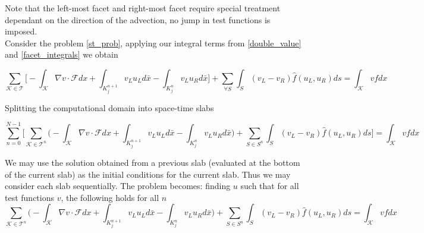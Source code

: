 \documentclass[11pt, oneside]{article}   	%
\begin{document}
Note that the left-most facet and right-most facet require special treatment dependant on the direction of the advection, no jump in test functions is imposed.\\
Consider the problem \eqref{st_prob}, applying our integral terms from \eqref{double_value} and \eqref{facet_integrals} we obtain
\begin{small}
\[\sum_{\mathcal{K}\in\mathcal{T}} 
\bigg[ - \int_{\mathcal{K}} \nabla v \cdot \mathcal{F} dx + \int_{K_j^{n+1}} v_L u_L d\bar{x} - \int_{K_j^n} v_L u_R d\bar{x} \bigg]
+ \sum_{\forall S} \int_S (v_L - v_R) \hat{f}(u_L,u_R)ds  =  \int_{\mathcal{K}} v f dx  \]
\end{small}
Splitting the computational domain into space-time slabs
\begin{small}
\[\sum_{n=0}^{N-1} 
\bigg[ \sum_{\mathcal{K}\in\mathcal{T}^n}  
	\bigg(- \int_{\mathcal{K}} \nabla v \cdot \mathcal{F} dx + \int_{K_j^{n+1}} v_L u_L d\bar{x} - \int_{K_j^n} v_L u_R d\bar{x}  \bigg)
	+ \sum_{S \in S^n} \int_S (v_L - v_R) \hat{f}(u_L,u_R)ds \bigg] =  \int_{\mathcal{K}} v f dx \]
\end{small}
We may use the solution obtained from a previous slab (evaluated at the bottom of the current slab) as the initial conditions for the current slab.
Thus we may consider each slab sequentially. The problem becomes: finding $u$ such that for all test functions $v$, the following holds for all $n$
\begin{equation}\label{st_weakform}
\sum_{\mathcal{K}\in\mathcal{T}^n}  
	\bigg(- \int_{\mathcal{K}} \nabla v \cdot \mathcal{F} dx + \int_{K_j^{n+1}} v_L u_L d\bar{x} - \int_{K_j^n} v_L u_R d\bar{x}  \bigg)
	+ \sum_{S \in S^n} \int_S (v_L - v_R) \hat{f}(u_L,u_R)ds = \int_{\mathcal{K}} v f dx 
\end{equation}

\clearpage
%
%
\end{document}
